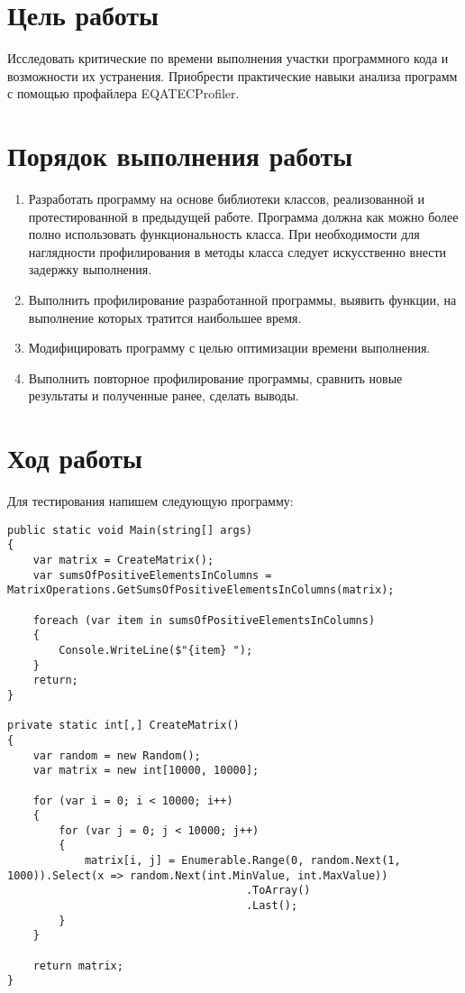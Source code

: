 \documentclass[a4paper,14pt]{extarticle}
\begin{document}

\section{Цель работы}
Исследовать критические по времени выполнения участки программного
кода и возможности их устранения. Приобрести практические навыки анализа
программ с помощью профайлера EQATECProfiler.

\section{Порядок выполнения работы}
\begin{enumerate}
    \item Разработать программу на основе библиотеки классов, реализованной
    и протестированной в предыдущей работе. Программа должна как можно более
    полно использовать функциональность класса. При необходимости для
    наглядности профилирования в методы класса следует искусственно внести
    задержку выполнения.
    \item Выполнить профилирование разработанной программы, выявить
    функции, на выполнение которых тратится наибольшее время.
    \item Модифицировать программу с целью оптимизации времени
    выполнения.
    \item Выполнить повторное профилирование программы, сравнить новые
    результаты и полученные ранее, сделать выводы.
\end{enumerate}

\section{Ход работы}
Для тестирования напишем следующую программу:
\begin{lstlisting}
public static void Main(string[] args)
{
    var matrix = CreateMatrix();
    var sumsOfPositiveElementsInColumns = MatrixOperations.GetSumsOfPositiveElementsInColumns(matrix);

    foreach (var item in sumsOfPositiveElementsInColumns)
    {
        Console.WriteLine($"{item} ");
    }
    return;
}

private static int[,] CreateMatrix()
{
    var random = new Random();
    var matrix = new int[10000, 10000];

    for (var i = 0; i < 10000; i++)
    {
        for (var j = 0; j < 10000; j++)
        {
            matrix[i, j] = Enumerable.Range(0, random.Next(1, 1000)).Select(x => random.Next(int.MinValue, int.MaxValue))
                                     .ToArray()
                                     .Last();
        }
    }

    return matrix;
}
\end{lstlisting}
\end{document}
